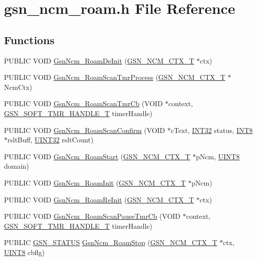 \hypertarget{a00530}{
\section{gsn\_\-ncm\_\-roam.h File Reference}
\label{a00530}
}
\subsection*{Functions}
\begin{DoxyCompactItemize}
\item 
PUBLIC VOID \hyperlink{a00530_af6a75c1ac4004f68fcd5fdc301710344}{GsnNcm\_\-RoamDeInit} (\hyperlink{a00158}{GSN\_\-NCM\_\-CTX\_\-T} $\ast$ctx)
\item 
PUBLIC VOID \hyperlink{a00530_aeaca1aa377ca562092cf214937116952}{GsnNcm\_\-RoamScanTmrProcess} (\hyperlink{a00158}{GSN\_\-NCM\_\-CTX\_\-T} $\ast$NcmCtx)
\item 
PUBLIC VOID \hyperlink{a00530_a9c426f9e2a5612e7468517aa5ef27967}{GsnNcm\_\-RoamScanTmrCb} (VOID $\ast$context, \hyperlink{a00229}{GSN\_\-SOFT\_\-TMR\_\-HANDLE\_\-T} timerHandle)
\item 
PUBLIC VOID \hyperlink{a00530_a5402e131f1d1368af14b4eab19a075ed}{GsnNcm\_\-RoamScanConfirm} (VOID $\ast$cText, \hyperlink{a00660_ga63021d67d54286c2163bcdb43a6f2569}{INT32} status, \hyperlink{a00660_ga307b8734c020247f6bac4fcde0dcfbb9}{INT8} $\ast$rsltBuff, \hyperlink{a00660_gae1e6edbbc26d6fbc71a90190d0266018}{UINT32} rsltCount)
\item 
PUBLIC VOID \hyperlink{a00530_af1821c899e48b213f8ea984838775ce9}{GsnNcm\_\-RoamStart} (\hyperlink{a00158}{GSN\_\-NCM\_\-CTX\_\-T} $\ast$pNcm, \hyperlink{a00660_gab27e9918b538ce9d8ca692479b375b6a}{UINT8} domain)
\item 
PUBLIC VOID \hyperlink{a00530_ab5d1ee00112b447611ebbc9bab9c9017}{GsnNcm\_\-RoamInit} (\hyperlink{a00158}{GSN\_\-NCM\_\-CTX\_\-T} $\ast$pNcm)
\item 
PUBLIC VOID \hyperlink{a00530_ac24e8cd2340cf28bcfb94055f2df0add}{GsnNcm\_\-RoamReInit} (\hyperlink{a00158}{GSN\_\-NCM\_\-CTX\_\-T} $\ast$ctx)
\item 
PUBLIC VOID \hyperlink{a00530_a4ea389a03af049b5159c497705f14fe4}{GsnNcm\_\-RoamScanPauseTmrCb} (VOID $\ast$context, \hyperlink{a00229}{GSN\_\-SOFT\_\-TMR\_\-HANDLE\_\-T} timerHandle)
\item 
PUBLIC \hyperlink{a00660_gada5951904ac6110b1fa95e51a9ddc217}{GSN\_\-STATUS} \hyperlink{a00530_a0e6617e278cc0a9830ee00047e6b025c}{GsnNcm\_\-RoamStop} (\hyperlink{a00158}{GSN\_\-NCM\_\-CTX\_\-T} $\ast$ctx, \hyperlink{a00660_gab27e9918b538ce9d8ca692479b375b6a}{UINT8} cbflg)
\end{DoxyCompactItemize}


